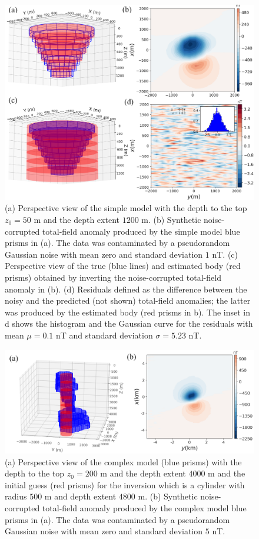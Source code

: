 \begin{figure}
    \centering
    \includegraphics[scale=.75]{figures/kimberlite_4figures.png}
    \caption{(a) Perspective view of the simple model with the depth to the top $z_0 = 50$ m and the depth extent $1200$ m. (b) Synthetic noise-corrupted total-field anomaly produced by the simple model blue prisms in (a). The data was contaminated by a pseudorandom Gaussian noise with mean zero and standard deviation $1$ nT. (c) Perspective view of the true (blue lines) and estimated body (red prisms) obtained by inverting the noise-corrupted total-field anomaly in (b). (d) Residuals defined as the difference between the noisy and the predicted (not shown) total-field anomalies; the latter was produced by the estimated body (red prisms in b). The inset in d shows the histogram and the Gaussian curve for the residuals with mean $\mu=0.1$ nT and standard deviation $\sigma=5.23$ nT.
}
    \label{fig:kimb}
\end{figure}

\begin{figure}
    \centering
    \includegraphics[scale=.75]{figures/complex_3d_ini_data.png}
    \caption{(a) Perspective view of the complex model (blue prisms) with the depth to the top $z_0 = 200$ m and the depth extent $4000$ m and the initial guess (red prisms) for the inversion which is a cylinder with radius $500$ m and depth extent $4800$ m. (b) Synthetic noise-corrupted total-field anomaly produced by the complex model blue prisms in (a). The data was contaminated by a pseudorandom Gaussian noise with mean zero and standard deviation $5$ nT.
}
    \label{fig:complex_model}
\end{figure}


